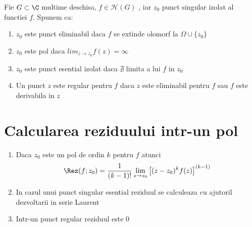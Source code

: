 \begin{definition}
    Fie $G \subset \C$ multime deschisa, $f\in\mathcal{H}(G)$ , iar $z_0$ punct singular
    izolat al functiei $f$. Spunem ca:
    \begin{enumerate}
        \item  $z_0$ este punct eliminabil daca $f$ se extinde olomorf la $\Omega \cup \{z_0\}$
        \item  $z_0$ este pol daca $lim_{z \to z_0} f(z) = \infty$
        \item  $z_0$ este punct esential izolat daca $\nexists$ limita a lui $f$ in $z_0$
        \item Un punct $z$ este regular pentru $f$ daca $z$ este eliminabil pentru $f$
        sau $f$ este derivabila in $z$
    \end{enumerate}
\end{definition}

\section{Calcularea reziduului intr-un pol}
\begin{enumerate}
    \item Daca $z_0$ este un pol de ordin $k$ pentru $f$ atunci
    \[
    \Rez(f;z_0) = \frac{1}{(k-1)!}\lim_{z \to z_0} \left[(z-z_0)^k f(z) \right]^{(k-1)}
    \]
    \item In cazul unui punct singular esential reziduul se calculeaza cu ajutoril dezvoltarii
    in serie Laurent
    \item Intr-un punct regular reziduul este 0
\end{enumerate}
